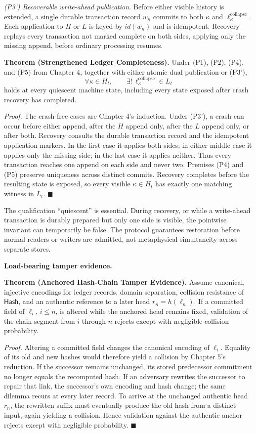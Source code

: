 \documentclass[11pt,openany]{book}
\newcommand{\Hash}{\mathsf{Hash}}
\begin{document}
\emph{(P3') Recoverable write-ahead publication.} Before either visible history
is extended, a single durable transaction record \(w_\kappa\) commits to both
\(\kappa\) and \(\ell_\kappa^{\mathrm{collapse}}\). Each application to \(H\)
or \(L\) is keyed by \(id(w_\kappa)\) and is idempotent. Recovery replays every
transaction not marked complete on both sides, applying only the missing
append, before ordinary processing resumes.

\textbf{Theorem (Strengthened Ledger Completeness).} Under (P1), (P2), (P4),
and (P5) from Chapter 4, together with either atomic dual publication or (P3'),
\[
 \forall \kappa\in H_t,\qquad
 \exists!\,\ell_\kappa^{\mathrm{collapse}}\in L_t
\]
holds at every quiescent machine state, including every state exposed after
crash recovery has completed.

\emph{Proof.} The crash-free cases are Chapter 4's induction. Under (P3'), a
crash can occur before either append, after the \(H\) append only, after the
\(L\) append only, or after both. Recovery consults the durable transaction
record and the idempotent application markers. In the first case it applies
both sides; in either middle case it applies only the missing side; in the last
case it applies neither. Thus every transaction reaches one append on each side
and never two. Premises (P4) and (P5) preserve uniqueness across distinct
commits. Recovery completes before the resulting state is exposed, so every
visible \(\kappa\in H_t\) has exactly one matching witness in \(L_t\).
\(\blacksquare\)

The qualification “quiescent” is essential. During recovery, or while a
write-ahead transaction is durably prepared but only one side is visible, the
pointwise invariant can temporarily be false. The protocol guarantees
restoration before normal readers or writers are admitted, not metaphysical
simultaneity across separate stores.

\textbf{Load-bearing tamper evidence.}

\textbf{Theorem (Anchored Hash-Chain Tamper Evidence).} Assume canonical,
injective encodings for ledger records, domain separation, collision resistance
of \(\Hash\), and an authentic reference to a later head \(r_n=h(\ell_n)\).
If a committed field of \(\ell_i\), \(i\leq n\), is altered while the anchored
head remains fixed, validation of the chain segment from \(i\) through \(n\)
rejects except with negligible collision probability.

\emph{Proof.} Altering a committed field changes the canonical encoding of
\(\ell_i\). Equality of its old and new hashes would therefore yield a
collision by Chapter 5's reduction. If the successor remains unchanged, its
stored predecessor commitment no longer equals the recomputed hash. If an
adversary rewrites the successor to repair that link, the successor's own
encoding and hash change; the same dilemma recurs at every later record. To
arrive at the unchanged authentic head \(r_n\), the rewritten suffix must
eventually produce the old hash from a distinct input, again yielding a
collision. Hence validation against the authentic anchor rejects except with
negligible probability. \(\blacksquare\)
\end{document}
